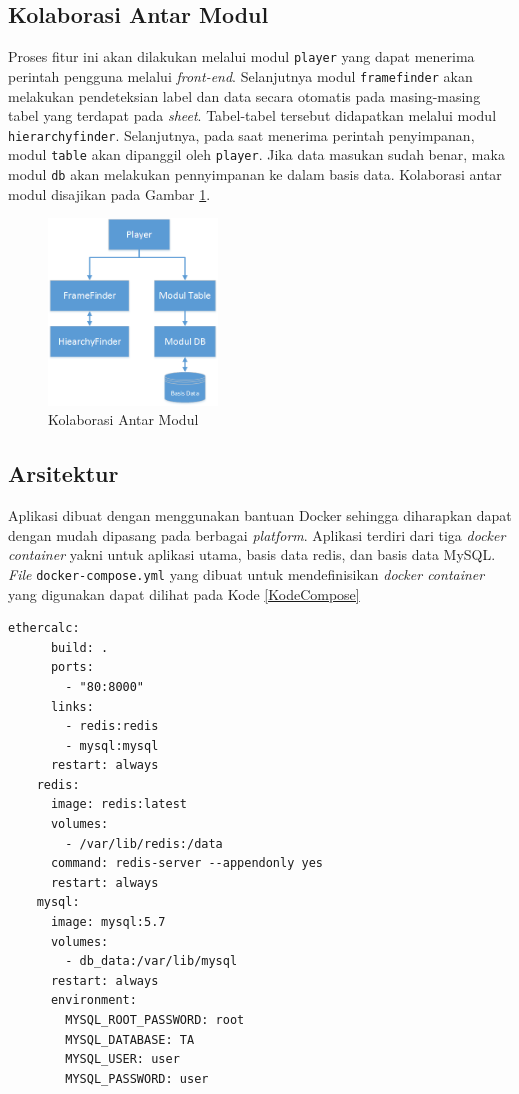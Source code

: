 	\subsection{Kolaborasi Antar Modul}
	Proses fitur ini akan dilakukan melalui modul \texttt{player} yang dapat menerima perintah pengguna melalui \textit{front-end}. Selanjutnya modul \texttt{framefinder} akan melakukan pendeteksian label dan data secara otomatis pada masing-masing tabel yang terdapat pada \textit{sheet}. Tabel-tabel tersebut didapatkan melalui modul \texttt{hierarchyfinder}. Selanjutnya, pada saat menerima perintah penyimpanan, modul \texttt{table} akan dipanggil oleh \texttt{player}. Jika data masukan sudah benar, maka modul \texttt{db} akan melakukan pennyimpanan ke dalam basis data. Kolaborasi antar modul disajikan pada Gambar \ref{ModuleFlow}.

	\begin{figure}[htb]
	    \centering
	    \includegraphics[width=0.4\textwidth]{resources/chapter-4-module-flow.png}
	    \caption{Kolaborasi Antar Modul}
		\label{ModuleFlow}
	\end{figure}

	\subsection{Arsitektur}
	Aplikasi dibuat dengan menggunakan bantuan Docker sehingga diharapkan dapat dengan mudah dipasang pada berbagai \textit{platform}. Aplikasi terdiri dari tiga \textit{docker container} yakni untuk aplikasi utama, basis data redis, dan basis data MySQL. \textit{File} \texttt{docker-compose.yml} yang dibuat untuk mendefinisikan \textit{docker container} yang digunakan dapat dilihat pada Kode \ref{KodeCompose}

	\begin{lstlisting}[frame=single, basicstyle=\linespread{1}\scriptsize\listingsfont, captionpos=b, caption={Kode pada docker-compose.yml}, label=KodeCompose]
	ethercalc:
	  build: .
	  ports:
	    - "80:8000"
	  links:
	    - redis:redis
	    - mysql:mysql
	  restart: always
	redis:
	  image: redis:latest
	  volumes:
	    - /var/lib/redis:/data
	  command: redis-server --appendonly yes
	  restart: always
	mysql:
	  image: mysql:5.7
	  volumes:
	    - db_data:/var/lib/mysql
	  restart: always
	  environment:
	    MYSQL_ROOT_PASSWORD: root
	    MYSQL_DATABASE: TA
	    MYSQL_USER: user
	    MYSQL_PASSWORD: user
	\end{lstlisting}

